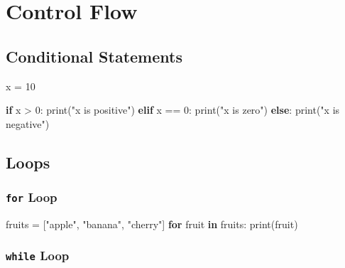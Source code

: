 \documentclass[
  letterpaper,
  DIV=11,
  numbers=noendperiod]{scrreprt}
\newenvironment{Shaded}{\begin{snugshade}}{\end{snugshade}}
\newcommand{\BuiltInTok}[1]{\textcolor[rgb]{0.00,0.23,0.31}{#1}}
\newcommand{\ControlFlowTok}[1]{\textcolor[rgb]{0.00,0.23,0.31}{\textbf{#1}}}
\newcommand{\DecValTok}[1]{\textcolor[rgb]{0.68,0.00,0.00}{#1}}
\newcommand{\KeywordTok}[1]{\textcolor[rgb]{0.00,0.23,0.31}{\textbf{#1}}}
\newcommand{\NormalTok}[1]{\textcolor[rgb]{0.00,0.23,0.31}{#1}}
\newcommand{\OperatorTok}[1]{\textcolor[rgb]{0.37,0.37,0.37}{#1}}
\newcommand{\StringTok}[1]{\textcolor[rgb]{0.13,0.47,0.30}{#1}}
\begin{document}
\section{Control Flow}\label{control-flow}

\subsection{Conditional Statements}\label{conditional-statements-1}

\begin{Shaded}
\begin{Highlighting}[]
\NormalTok{x }\OperatorTok{=} \DecValTok{10}

\ControlFlowTok{if}\NormalTok{ x }\OperatorTok{\textgreater{}} \DecValTok{0}\NormalTok{:}
    \BuiltInTok{print}\NormalTok{(}\StringTok{"x is positive"}\NormalTok{)}
\ControlFlowTok{elif}\NormalTok{ x }\OperatorTok{==} \DecValTok{0}\NormalTok{:}
    \BuiltInTok{print}\NormalTok{(}\StringTok{"x is zero"}\NormalTok{)}
\ControlFlowTok{else}\NormalTok{:}
    \BuiltInTok{print}\NormalTok{(}\StringTok{"x is negative"}\NormalTok{)}
\end{Highlighting}
\end{Shaded}

\subsection{Loops}\label{loops-1}

\subsubsection{\texorpdfstring{\texttt{for}
Loop}{for Loop}}\label{for-loop-1}

\begin{Shaded}
\begin{Highlighting}[]
\NormalTok{fruits }\OperatorTok{=}\NormalTok{ [}\StringTok{"apple"}\NormalTok{, }\StringTok{"banana"}\NormalTok{, }\StringTok{"cherry"}\NormalTok{]}
\ControlFlowTok{for}\NormalTok{ fruit }\KeywordTok{in}\NormalTok{ fruits:}
    \BuiltInTok{print}\NormalTok{(fruit)}
\end{Highlighting}
\end{Shaded}

\subsubsection{\texorpdfstring{\texttt{while}
Loop}{while Loop}}\label{while-loop-1}
\end{document}

